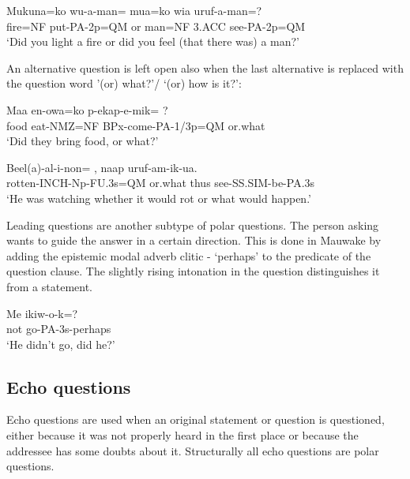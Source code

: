 \ea%
\label{ex:x1186}
\gll Mukuna=ko  wu-a-man=    mua=ko  wia  uruf-a-man=? \\
fire=NF  put-PA-2p=QM  or  man=NF  3.ACC  see-PA-2p=QM      \\
\glt `Did you light a fire or did you feel (that there was) a man?'
\z





An alternative question is left open also when the last alternative is replaced with the question word  '(or) what?'/ `(or) how is it?':

\ea%
\label{ex:x1350}
\gll Maa  en-owa=ko  p-ekap-e-mik=  ? \\
food  eat-NMZ=NF  BPx-come-PA-1/3p=QM  or.what      \\
\glt `Did they bring food, or what?'
\z





\ea%
\label{ex:x1351}
\gll Beel(a)-al-i-non=  ,  naap  uruf-am-ik-ua. \\
rotten-INCH-Np-FU.3s=QM  or.what  thus  see-SS.SIM-be-PA.3s      \\
\glt `He was watching whether it would rot or what would happen.'
\z





Leading questions are another subtype of polar questions. The person asking wants to guide the answer in a certain direction. This is done in Mauwake by adding the epistemic modal adverb clitic - `perhaps' to the predicate of the question clause. The slightly rising intonation in the question distinguishes it from a statement. 

\ea%
\label{ex:x1349}
\gll Me  ikiw-o-k=? \\
not  go-PA-3s-perhaps      \\
\glt `He didn't go, did he?'
\z




\subsection{Echo questions}
{}
Echo questions are used when an original statement or question is questioned, either because it was not properly heard in the first place or because the addressee has some doubts about it. Structurally all echo questions are polar questions.

